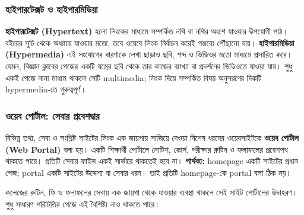 \subsubsection{হাইপারটেক্সট ও হাইপারমিডিয়া}
\textbf{হাইপারটেক্সট (Hypertext)} হলো লিংকের মাধ্যমে সম্পর্কিত নথি বা নথির অংশে যাওয়ার উপযোগী পাঠ। বইয়ের সূচি থেকে অধ্যায়ে যাওয়ার মতো, তবে ওয়েবে লিংক নির্বাচন করেই গন্তব্যে পৌঁছানো যায়। \textbf{হাইপারমিডিয়া (Hypermedia)} এই সংযোগের ধারণাকে লেখা ছাড়াও ছবি, শব্দ ও ভিডিওর মতো মাধ্যমে প্রসারিত করে। যেমন, বিজ্ঞান ক্লাবের পেজের একটি যন্ত্রের ছবি থেকে তার কাজের ব্যাখ্যা বা প্রদর্শনের ভিডিওতে যাওয়া যায়। শুধু একই পেজে নানা মাধ্যম থাকলে সেটি multimedia; লিংক দিয়ে সম্পর্কিত বিষয় অনুসরণের দিকটি hypermedia-তে গুরুত্বপূর্ণ।

\subsubsection{ওয়েব পোর্টাল: সেবার প্রবেশদ্বার}
বিভিন্ন তথ্য, সেবা ও সংশ্লিষ্ট সাইটের লিংক এক জায়গায় সাজিয়ে দেওয়া বিশেষ ধরনের ওয়েবসাইটকে \textbf{ওয়েব পোর্টাল (Web Portal)} বলা হয়। একটি শিক্ষার্থী পোর্টালে নোটিশ, কোর্স, পরীক্ষার রুটিন ও ফলাফলের প্রবেশপথ থাকতে পারে। প্রতিটি সেবার ফাইল একই সার্ভারে থাকতেই হবে না। \textbf{পার্থক্য:} homepage একটি সাইটের প্রধান পেজ; portal একটি সাইটের উদ্দেশ্য বা সেবার ধরন। তাই প্রতিটি homepage-কে portal বলা ঠিক নয়।

কলেজের রুটিন, ফি ও ফলাফলের সেবায় এক জায়গা থেকে যাওয়ার ব্যবস্থা থাকলে সেই সাইট পোর্টালের উদাহরণ। শুধু সাধারণ পরিচিতির পেজে এই বৈশিষ্ট্য নাও থাকতে পারে।
